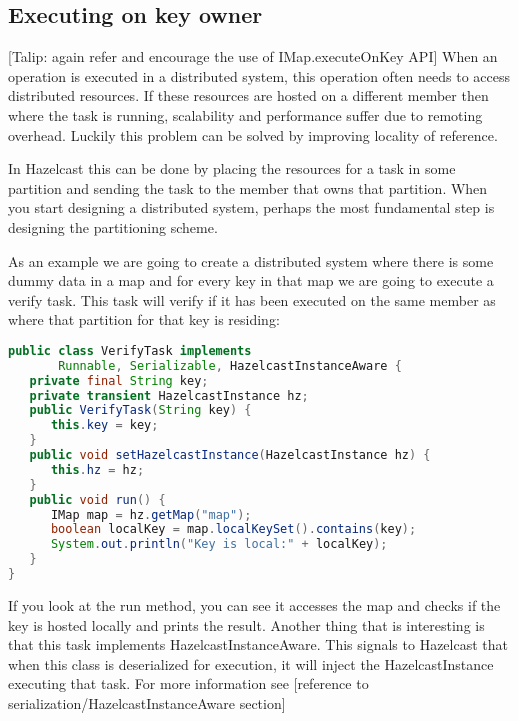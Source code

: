 \subsection{Executing on key owner}
[Talip: again refer and encourage the use of IMap.executeOnKey API]
When an operation is executed in a distributed system, this operation often needs to access distributed resources. If these resources are hosted on a different member then where the task is running, scalability and performance suffer due to remoting overhead. Luckily this problem can be solved by improving locality of reference.

In Hazelcast this can be done by placing the resources for a task in some partition and sending the task to the member that owns that partition. When you start designing a distributed system, perhaps the most fundamental step is designing the partitioning scheme.

As an example we are going to create a distributed system where there is some dummy data in a map and for every key in that map we are going to execute a verify task. This task will verify if it has been executed on the same member as where that partition for that key is residing:
\begin{lstlisting}[language=java]
public class VerifyTask implements
       Runnable, Serializable, HazelcastInstanceAware {
   private final String key;
   private transient HazelcastInstance hz;
   public VerifyTask(String key) { 
      this.key = key;
   }
   public void setHazelcastInstance(HazelcastInstance hz) {
      this.hz = hz;
   }
   public void run() {
      IMap map = hz.getMap("map");
      boolean localKey = map.localKeySet().contains(key);
      System.out.println("Key is local:" + localKey);
   }
}
\end{lstlisting}
If you look at the run method, you can see it accesses the map and checks if the key is hosted locally and prints the result. Another thing that is interesting is that this task implements HazelcastInstanceAware. This signals to Hazelcast that when this class is deserialized for execution, it will inject the HazelcastInstance executing that task. For more information see [reference to serialization/HazelcastInstanceAware section]

